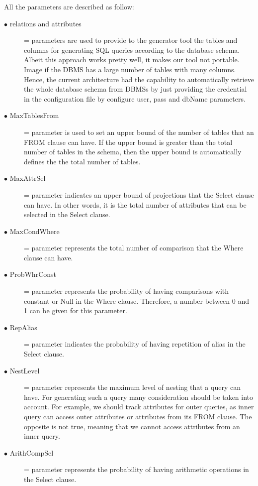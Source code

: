 All the parameters are described as follow:
\begin{description}
   \item[$\bullet$ relations and attributes] =  parameters are used to provide to the generator tool the tables and columns for generating SQL queries according to the database schema. Albeit this approach works pretty well, it makes our tool not portable. Image if the DBMS has a large number of tables with many columns. Hence, the current architecture had the capability to automatically retrieve the whole database schema from DBMSs by just providing the credential in the configuration file by configure user, pass and dbName parameters. 

\item[$\bullet$ MaxTablesFrom] = parameter is used to set an upper bound of the number of tables that an FROM clause can have. If the upper bound is greater than the total number of tables in the schema, then the upper bound is automatically defines the the total number of tables. 

\item[$\bullet$ MaxAttrSel] = parameter indicates an upper bound of projections that the Select clause can have. In other words, it is the total number of attributes that can be selected in the Select clause.
 
\item[$\bullet$ MaxCondWhere]= parameter represents the total number of comparison that the Where clause can have. 

 
\item[$\bullet$ ProbWhrConst] = parameter represents the probability of having comparisons with constant or Null in the Where clause. Therefore, a number between 0 and 1 can be given for this parameter.  

\item[$\bullet$ RepAlias]= parameter indicates the probability of having repetition of alias in the Select clause. 

\item[$\bullet$ NestLevel]= parameter represents the maximum level of nesting that a query can have. For generating such a query many consideration should be taken into account. For example, we should track attributes for outer queries, as inner query can access outer attributes or attributes from its FROM clause. The opposite is not true, meaning that we cannot access attributes from an inner query. 

\item[$\bullet$ ArithCompSel] = parameter represents the probability of having arithmetic operations in the Select clause. 


\end{description}

